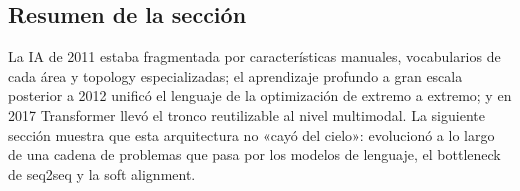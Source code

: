 
\subsection{Resumen de la sección}

La IA de 2011 estaba fragmentada por características manuales, vocabularios de cada área y topology especializadas; el aprendizaje profundo a gran escala posterior a 2012 unificó el lenguaje de la optimización de extremo a extremo; y en 2017 Transformer llevó el tronco reutilizable al nivel multimodal. La siguiente sección muestra que esta arquitectura no «cayó del cielo»: evolucionó a lo largo de una cadena de problemas que pasa por los modelos de lenguaje, el bottleneck de seq2seq y la soft alignment.
